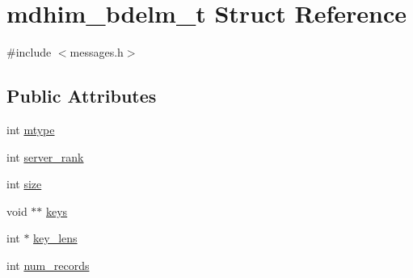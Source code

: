 \hypertarget{structmdhim__bdelm__t}{\section{mdhim\-\_\-bdelm\-\_\-t Struct Reference}
\label{d4/ddf/structmdhim__bdelm__t}
}


{\ttfamily \#include $<$messages.\-h$>$}

\subsection*{Public Attributes}
\begin{DoxyCompactItemize}
\item 
int \hyperlink{structmdhim__bdelm__t_a9723fe671281596fa43c80b13ea7eb9c}{mtype}
\item 
int \hyperlink{structmdhim__bdelm__t_a5c455aeb5d7804c4d448d5b3f624c6e6}{server\-\_\-rank}
\item 
int \hyperlink{structmdhim__bdelm__t_a1c92bb6d1ffe28e7cd24aa2041f469da}{size}
\item 
void $\ast$$\ast$ \hyperlink{structmdhim__bdelm__t_a7e218a41a470e47c65040491f879985d}{keys}
\item 
int $\ast$ \hyperlink{structmdhim__bdelm__t_a12057b9c3f79456910521cd628b31415}{key\-\_\-lens}
\item 
int \hyperlink{structmdhim__bdelm__t_a3a51d42f3dee8ffd91aa208cdd2be0a3}{num\-\_\-records}
\end{DoxyCompactItemize}


